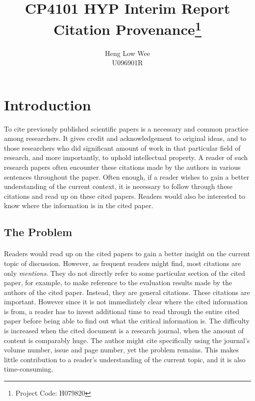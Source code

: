 \documentclass[12 pt]{article}
\begin{document}

\title{CP4101 HYP Interim Report \\ Citation Provenance\footnote{Project Code: H079820}}
\author{Heng Low Wee \\ U096901R}
\maketitle

\section{Introduction}
\paragraph{}
To cite previously published scientific papers is a necessary and common practice among researchers. It gives credit and acknowledgement to original ideas, and to those researchers who did significant amount of work in that particular field of research, and more importantly, to uphold intellectual property. A reader of such research papers often encounter these citations made by the authors in various sentences throughout the paper. Often enough, if a reader wishes to gain a better understanding of the current context, it is necessary to follow through these citations and read up on these cited papers. Readers would also be interested to know where the information is in the cited paper.

\subsection{The Problem}
\paragraph{}
Readers would read up on the cited papers to gain a better insight on the current topic of discussion. However, as frequent readers might find, most citations are only \textit{mentions}. They do not directly refer to some particular section of the cited paper, for example, to make reference to the evaluation results made by the authors of the cited paper. Instead, they are general citations. These citations are important. However since it is not immediately clear where the cited information is from, a reader has to invest additional time to read through the entire cited paper before being able to find out what the critical information is. The difficulty is increased when the cited document is a research journal, when the amount of content is comparably huge. The author might cite specifically using the journal's volume number, issue and page number, yet the problem remains. This makes little contribution to a reader's understanding of the current topic, and it is also time-consuming.
\end{document}
